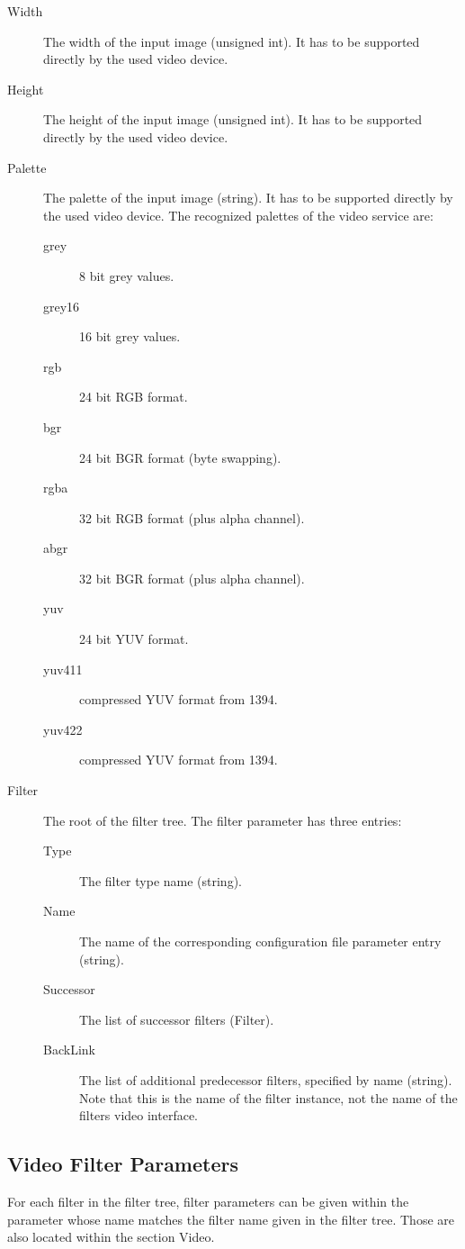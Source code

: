 \begin{description}
\item[Width] The width of the input image (unsigned int).
  It has to be supported directly by the used video device.
\item[Height] The height of the input image (unsigned int).
  It has to be supported directly by the used video device.
\item[Palette] The palette of the input image (string).
  It has to be supported directly by the used video device.
  The recognized palettes of the video service are:
  \begin{description}
  \item[grey] 8 bit grey values.
  \item[grey16] 16 bit grey values.
  \item[rgb] 24 bit RGB format.
  \item[bgr] 24 bit BGR format (byte swapping).
  \item[rgba] 32 bit RGB format (plus alpha channel).
  \item[abgr] 32 bit BGR format (plus alpha channel).
  \item[yuv] 24 bit YUV format.
  \item[yuv411] compressed YUV format from 1394.
  \item[yuv422] compressed YUV format from 1394.
  \end{description}
\item[Filter] The root of the filter tree. The filter parameter
  has three entries:
  \begin{description}
  \item[Type] The filter type name (string).
  \item[Name] The name of the corresponding configuration file
    parameter entry (string).
    \item[Successor] The list of successor filters (Filter).
    \item[BackLink] The list of additional predecessor filters,
      specified by name (string). Note that this is the name of the
      filter instance, not the name of the filters video interface.
  \end{description}
\end{description}

\subsection{Video Filter Parameters}

For each filter in the filter tree, filter parameters can be given
within the parameter whose name matches the filter name given in the
filter tree. Those are also located within the section Video.

